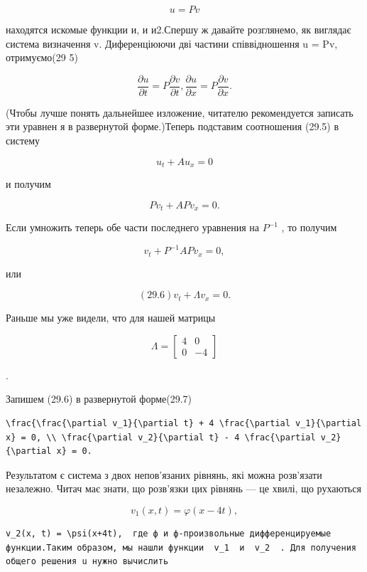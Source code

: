 \documentclass[
  ukrainian,
]{article}
\begin{document}
\[
u = Pv
\]

находятся искомые функции и, и и2.Спершу ж давайте розглянемо, як
виглядає система визначення v. Диференціюючи дві частини співвідношення
u = Pv, отримуємо(29 5)

\[
\frac{\partial u}{\partial t} = P \frac{\partial v}{\partial t},
\frac{\partial u}{\partial x} = P \frac{\partial v}{\partial x}.
\]

(Чтобы лучше понять дальнейшее изложение, читателю рекомендуется
записать эти уравнен я в развернутой форме.)Теперь подставим соотношения
(29.5) в систему

\[
u_t + Au_x = 0
\]

и получим

\[
Pv_t + APv_x = 0.
\]

Если умножить теперь обе части последнего уравнения на \(P^{-1}\) , то
получим

\[
v_t + P^{-1}APv_x = 0,
\]

или

\[
(29.6) v_t + \Lambda v_x = 0.
\]

Раньше мы уже видели, что для нашей матрицы

\[
\Lambda =
\begin{bmatrix} 4 & 0 \\ 0 & -4 \end{bmatrix}
\]

.

Запишем (29.6) в развернутой форме(29.7)

\begin{verbatim}
\frac{\frac{\partial v_1}{\partial t} + 4 \frac{\partial v_1}{\partial x} = 0, \\ \frac{\partial v_2}{\partial t} - 4 \frac{\partial v_2}{\partial x} = 0.
\end{verbatim}

Результатом є система з двох непов'язаних рівнянь, які можна розв'язати
незалежно. Читач має знати, що розв'язки цих рівнянь --- це хвилі, що
рухаються

\[
v_1(x, t) = \varphi(x-4t),
\]

\begin{verbatim}
v_2(x, t) = \psi(x+4t),  где ф и ф-произвольные дифференцируемые функции.Таким образом, мы нашли функции  v_1  и  v_2  . Для получения общего решения u нужно вычислить
\end{verbatim}
\end{document}
